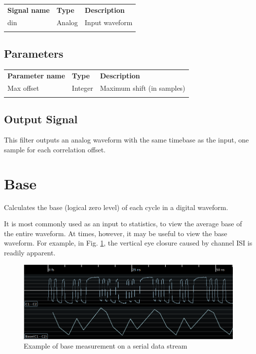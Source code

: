 \begin{tabularx}{16cm}{llX}
\thickhline
\textbf{Signal name} & \textbf{Type} & \textbf{Description} \\
\thickhline
din & Analog & Input waveform \\
\thickhline
\end{tabularx}

\subsection{Parameters}

\begin{tabularx}{16cm}{llX}
\thickhline
\textbf{Parameter name} & \textbf{Type} & \textbf{Description} \\
\thickhline
Max offset & Integer & Maximum shift (in samples)\\
\thickhline
\end{tabularx}

\subsection{Output Signal}

This filter outputs an analog waveform with the same timebase as the input, one sample for each correlation offset.

\pagebreak
\section{Base}
\label{filter:base}

Calculates the base (logical zero level) of each cycle in a digital waveform.

It is most commonly used as an input to statistics, to view the average base of the entire waveform. At times, however,
it may be useful to view the base waveform. For example, in Fig. \ref{filter_base}, the vertical eye closure caused by
channel ISI is readily apparent.

\begin{figure}[h]
\centering
\includegraphics[width=16cm]{images/filters/base.png}
\caption{Example of base measurement on a serial data stream}
\label{filter_base}
\end{figure}

